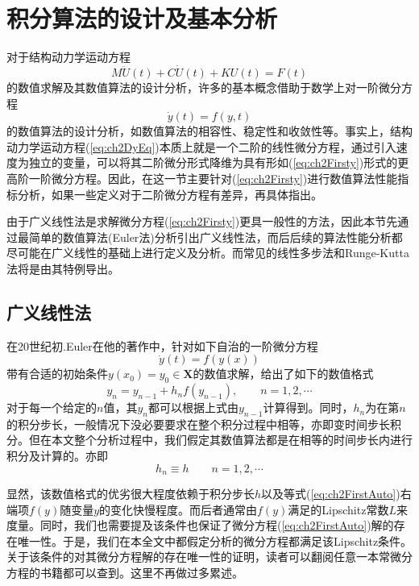 \chapter{积分算法的设计及基本分析}
对于结构动力学运动方程
\begin{equation}
M\ddot{U}(t)+C\dot{U}(t)+KU(t)=F(t)\label{eq:ch2DyEq}
\end{equation}
的数值求解及其数值算法的设计分析，许多的基本概念借助于数学上对一阶微分方程
\begin{equation}
\dot{y}(t)=f(y,t)\label{eq:ch2Firsty}
\end{equation}
的数值算法的设计分析，如数值算法的相容性、稳定性和收敛性等。事实上，结构动力学运动方程(\ref{eq:ch2DyEq})本质上就是一个二阶的线性微分方程，通过引入速度为独立的变量，可以将其二阶微分形式降维为具有形如(\ref{eq:ch2Firsty})形式的更高阶一阶微分方程。因此，在这一节主要针对(\ref{eq:ch2Firsty})进行数值算法性能指标分析，如果一些定义对于二阶微分方程有差异，再具体指出。

由于广义线性法是求解微分方程(\ref{eq:ch2Firsty})更具一般性的方法，因此本节先通过最简单的数值算法(Euler法)分析引出广义线性法，而后后续的算法性能分析都尽可能在广义线性的基础上进行定义及分析。而常见的线性多步法和Runge-Kutta法将是由其特例导出。

\section{广义线性法}
在20世纪初.Euler在他的著作中，针对如下自治的一阶微分方程
\begin{equation}
\dot{y}(t)=f(y(x))\label{eq:ch2FirstAuto}
\end{equation}
带有合适的初始条件$y(x_0)=y_0\in\mathbf{X}$的数值求解，给出了如下的数值格式
\begin{equation}
y_n=y_{n-1}+h_nf(y_{n-1}),\qquad n=1,2,\cdots\label{eq:ch2Euler}
\end{equation}
对于每一个给定的$n$值，其$y_n$都可以根据上式由$y_{n-1}$计算得到。同时，$h_n$为在第$n$的积分步长，一般情况下没必要要求在整个积分过程中相等，亦即变时间步长积分。但在本文整个分析过程中，我们假定其数值算法都是在相等的时间步长内进行积分及计算的。亦即
\begin{equation}
h_n\equiv h\qquad n=1,2,\cdots
\end{equation}

显然，该数值格式的优劣很大程度依赖于积分步长$h$以及等式(\ref{eq:ch2FirstAuto})右端项$f(y)$随变量$y$的变化快慢程度。而后者通常由$f(y)$满足的Lipschitz常数$L$来度量。同时，我们也需要提及该条件也保证了微分方程(\ref{eq:ch2FirstAuto})解的存在唯一性。于是，我们在本全文中都假定分析的微分方程都满足该Lipschitz条件。关于该条件的对其微分方程解的存在唯一性的证明，读者可以翻阅任意一本常微分方程的书籍都可以查到。这里不再做过多累述。

